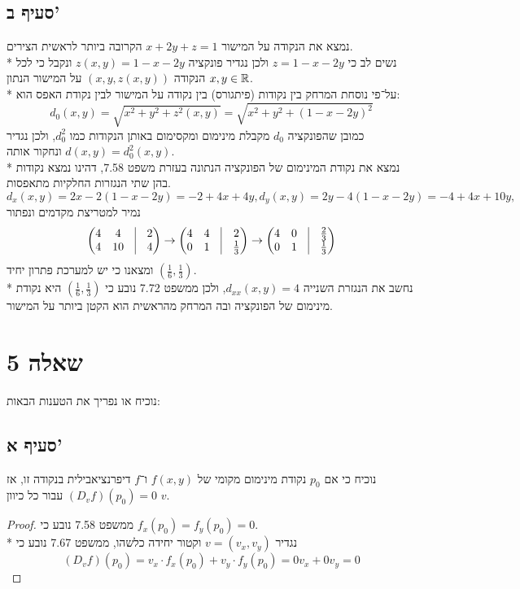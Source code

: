 \subsection{סעיף ב'}
נמצא את הנקודה על המישור $x + 2y + z = 1$ הקרובה ביותר לראשית הצירים. \\*
נשים לב כי $z = 1 - x - 2y$ ולכן נגדיר פונקציה $z(x, y) = 1 - x - 2y$ ונקבל כי לכל $x, y \in \mathbb{R}$ הנקודה $(x, y, z(x, y))$ על המישור הנתון. \\*
על־פי נוסחת המרחק בין נקודות (פיתגורס) בין נקודה על המישור לבין נקודת האפס הוא:
\[
	d_0(x, y)
	= \sqrt{x^2 + y^2 + z^2(x, y)}
	= \sqrt{x^2 + y^2 + {(1 - x - 2y)}^2}
\]
כמובן שהפונקציה $d_0$ מקבלת מינימום ומקסימום באותן הנקודות כמו $d_0^2$, ולכן נגדיר $d(x, y) = d_0^2(x, y)$ ונחקור אותה. \\*
נמצא את נקודת המינימום של הפונקציה הנתונה בעזרת משפט 7.58, דהינו נמצא נקודות בהן שתי הנגזרות החלקיות מתאפסות.
\[
	d_x(x, y) = 2x - 2(1 - x - 2y) = -2 + 4x + 4y,
	d_y(x, y) = 2y - 4(1 - x - 2y) = -4 + 4x + 10y,
\]
נמיר למטריצת מקדמים ונפתור
\[
	\begin{pmatrix}
		4 & 4 & \vline & 2 \\
		4 & 10 & \vline & 4
	\end{pmatrix}
	\rightarrow
	\begin{pmatrix}
		4 & 4 & \vline & 2 \\
		0 & 1 & \vline & \frac{1}{3}
	\end{pmatrix}
	\rightarrow
	\begin{pmatrix}
		4 & 0 & \vline & \frac{2}{3} \\
		0 & 1 & \vline & \frac{1}{3}
	\end{pmatrix}
\]
ומצאנו כי יש למערכת פתרון יחיד $(\frac{1}{6}, \frac{1}{3})$. \\*
נחשב את הנגזרת השנייה $d_{xx}(x, y) = 4$, ולכן ממשפט 7.72 נובע כי
$(\frac{1}{6}, \frac{1}{3})$ היא נקודת מינימום של הפונקציה ובה המרחק מהראשית הוא הקטן ביותר על המישור.

\section{שאלה 5}
נוכיח או נפריך את הטענות הבאות:

\subsection{סעיף א'}
נוכיח כי אם $p_0$ נקודת מינימום מקומי של $f(x, y)$ ו־$f$ דיפרנציאבילית בנקודה זו, אז $(D_v f)(p_0) = 0$ עבור כל כיוון $v$.
\begin{proof}
	 ממשפט 7.58 נובע כי $f_x(p_0) = f_y(p_0) = 0$. \\*
	 נגדיר $v = (v_x, v_y)$ וקטור יחידה כלשהו, ממשפט 7.67 נובע כי
	 \[
		 (D_v f)(p_0) = v_x \cdot f_x(p_0) + v_y \cdot f_y(p_0) = 0v_x + 0v_y = 0
	 \]
\end{proof}

